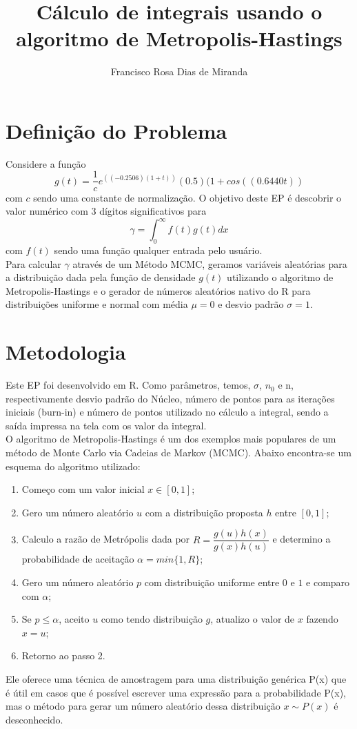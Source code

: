 \documentclass[a4paper,10pt]{article}
\title{Cálculo de integrais usando o algoritmo de Metropolis-Hastings}
\author{Francisco Rosa Dias de Miranda}
\begin{document}
\maketitle

\section{Definição do Problema}

Considere a função $$g(t) = \frac{1}{c} e^{((-0.2506)(1+t))} (0.5) (1 + cos((0.6440t))$$ com $c$ sendo uma constante de normalização. O objetivo deste EP é descobrir o valor numérico com 3 dígitos significativos  para $$\gamma = \int_0^\infty f(t) g(t)dx$$ com $f(t)$ sendo uma função qualquer entrada pelo usuário.
\\
 Para calcular $\gamma$ através de um Método MCMC, geramos variáveis aleatórias para a distribuição dada pela função de densidade $g(t)$ utilizando o algoritmo de Metropolis-Hastings e  o gerador de números aleatórios nativo do R para distribuições uniforme e normal com média $\mu = 0$ e desvio padrão $\sigma = 1$.

\section{Metodologia}

Este EP foi desenvolvido em R. Como parâmetros, temos, $\sigma$, $n_0$ e n, respectivamente desvio padrão do Núcleo, número de pontos para as iterações iniciais (burn-in) e número de pontos utilizado no cálculo a integral, sendo a saída impressa na tela com os valor da integral.
\\
O algoritmo de Metropolis-Hastings é um dos exemplos mais populares de um método de Monte Carlo via Cadeias de Markov (MCMC). Abaixo encontra-se um esquema do algoritmo utilizado:

\begin{enumerate}
\item Começo com um valor inicial $x \in [0,1]$;
\item Gero um número aleatório $u$ com a distribuição proposta $h$ entre $[0,1]$;
\item Calculo a razão de Metrópolis dada por $R=\dfrac{g(u)h(x)}{g(x)h(u)}$ e determino a probabilidade de aceitação $\alpha =min\{1,R\}$;
\item Gero um número aleatório $p$ com distribuição uniforme entre $0$ e $1$ e comparo com $\alpha$;
\item Se $p \leq \alpha$, aceito $u$ como tendo distribuição $g$, atualizo o valor de $x$ fazendo $x=u$;
\item Retorno ao passo 2.
\end{enumerate}
Ele oferece uma técnica de amostragem para uma distribuição genérica P(x) que é útil em casos que é possível escrever uma expressão para a probabilidade P(x), mas o método para gerar um número aleatório dessa distribuição $x \sim P(x)$ é desconhecido.
\end{document}
